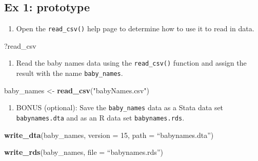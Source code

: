 \documentclass[]{book}
\newenvironment{Shaded}{\begin{snugshade}}{\end{snugshade}}
\newcommand{\KeywordTok}[1]{\textcolor[rgb]{0.13,0.29,0.53}{\textbf{#1}}}
\newcommand{\DataTypeTok}[1]{\textcolor[rgb]{0.13,0.29,0.53}{#1}}
\newcommand{\DecValTok}[1]{\textcolor[rgb]{0.00,0.00,0.81}{#1}}
\newcommand{\StringTok}[1]{\textcolor[rgb]{0.31,0.60,0.02}{#1}}
\newcommand{\NormalTok}[1]{#1}
\providecommand{\tightlist}{%
  \setlength{\itemsep}{0pt}\setlength{\parskip}{0pt}}
\begin{document}
\subsection{Ex 1: prototype}\label{ex-1-prototype}

\begin{enumerate}
\def\labelenumi{\arabic{enumi}.}
\tightlist
\item
  Open the \texttt{read\_csv()} help page to determine how to use it to
  read in data.
\end{enumerate}

\begin{Shaded}
\begin{Highlighting}[]
\NormalTok{?read_csv}
\end{Highlighting}
\end{Shaded}

\begin{enumerate}
\def\labelenumi{\arabic{enumi}.}
\setcounter{enumi}{1}
\tightlist
\item
  Read the baby names data using the \texttt{read\_csv()} function and
  assign the result with the name \texttt{baby\_names}.
\end{enumerate}

\begin{Shaded}
\begin{Highlighting}[]
\NormalTok{baby_names <-}\StringTok{ }\KeywordTok{read_csv}\NormalTok{(}\StringTok{"babyNames.csv"}\NormalTok{)}
\end{Highlighting}
\end{Shaded}

\begin{enumerate}
\def\labelenumi{\arabic{enumi}.}
\setcounter{enumi}{2}
\tightlist
\item
  BONUS (optional): Save the \texttt{baby\_names} data as a Stata data
  set \texttt{babynames.dta} and as an R data set
  \texttt{babynames.rds}.
\end{enumerate}

\begin{Shaded}
\begin{Highlighting}[]
\KeywordTok{write_dta}\NormalTok{(baby_names, }\DataTypeTok{version =} \DecValTok{15}\NormalTok{, }\DataTypeTok{path =}\NormalTok{ “babynames.dta”)}
 
\KeywordTok{write_rds}\NormalTok{(baby_names, }\DataTypeTok{file =}\NormalTok{ “babynames.rds”)}
\end{Highlighting}
\end{Shaded}
\end{document}
